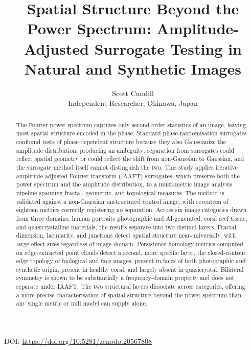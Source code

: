 \documentclass[a4paper,12pt]{article}
\title{Spatial Structure Beyond the Power Spectrum: Amplitude-Adjusted Surrogate Testing in Natural and Synthetic Images}
\author{Scott Cundill\\Independent Researcher, Okinawa, Japan}
\date{}
\begin{document}
\maketitle

\begin{center}
\small DOI: \url{https://doi.org/10.5281/zenodo.20567808}
\end{center}

\begin{abstract}
The Fourier power spectrum captures only second-order statistics of an image, leaving most spatial structure encoded in the phase. Standard phase-randomisation surrogates confound tests of phase-dependent structure because they also Gaussianize the amplitude distribution, producing an ambiguity: separation from surrogates could reflect spatial geometry or could reflect the shift from non-Gaussian to Gaussian, and the surrogate method itself cannot distinguish the two. This study applies iterative amplitude-adjusted Fourier transform (IAAFT) surrogates, which preserve both the power spectrum and the amplitude distribution, to a multi-metric image analysis pipeline spanning fractal, geometric, and topological measures. The method is validated against a non-Gaussian unstructured control image, with seventeen of eighteen metrics correctly registering no separation. Across six image categories drawn from three domains, human portraits photographic and AI-generated, coral reef tissue, and quasicrystalline materials, the results separate into two distinct layers. Fractal dimension, lacunarity, and junctions detect spatial structure near-universally, with large effect sizes regardless of image domain. Persistence homology metrics computed on edge-extracted point clouds detect a second, more specific layer, the closed-contour edge topology of biological and face images, present in faces of both photographic and synthetic origin, present in healthy coral, and largely absent in quasicrystal. Bilateral symmetry is shown to be substantially a frequency-domain property and does not separate under IAAFT. The two structural layers dissociate across categories, offering a more precise characterisation of spatial structure beyond the power spectrum than any single metric or null model can supply alone.
\end{abstract}

\end{document}
